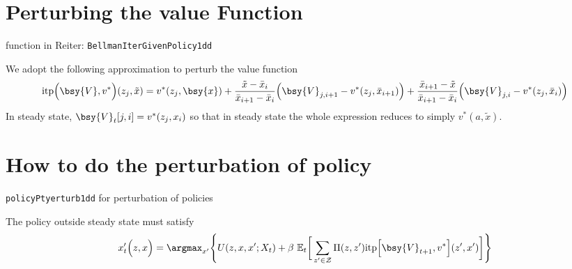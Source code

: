\documentclass[a4paper,10pt]{article}  %
\begin{document}
\newpage
\appendix
\section{Perturbing the value Function} %
\label{sub:perturbing_the_value_function}

function in Reiter: \texttt{BellmanIterGivenPolicy1dd}

We adopt the following approximation to perturb the value function
\begin{equation}
   \label{eq:interpol}
   \text{itp} \Big(  \bsy{V}, v^{*} \Big)(z_j, \tilde{x} ) = v^*( z_j, \bsy{x} ) + 
      \frac{ \tilde{x} - \bar{x}_i }{ \bar{x}_{i+1} - \bar{x}_i }    \Big( \bsy{V}_{j, i+1} - v^{*}( z_j, \bar{x}_{i+1}) \Big) +
      \frac{ \bar{x}_{i+1} -\tilde{x} }{ \bar{x}_{i+1} - \bar{x}_i } \Big( \bsy{V}_{j, i}   - v^{*}(z_j, \bar{x}_i) \Big)
\end{equation}
In steady state, $\bsy{V}_t[ j,i ] = v^* ( z_j,x_i ) $ so that in steady state the whole expression reduces to simply $ v^*( a, \tilde{x} ) $.

\section{How to do the perturbation of policy} %
\label{sub:how_to_do_the_perturbation_of_policy}

\texttt{policyPtyerturb1dd} for perturbation of policies

The policy outside steady state must satisfy
\begin{equation}
   \label{eq:maximization_prob}
   x_{t}'\Big( z, x \Big) = \argmax_{x'} \Bigg\{ U(z,x,x'; X_t) + \beta \ 
      \mathbb{E}_t
      \bigg[ 
         \sum_{ z' \in \mathcal{Z} } \Pi(z,z') \text{itp} \Big[ \bsy{V}_{t+1} , v^* \Big]( z', x' ) 
      \bigg]
      \Bigg\}
\end{equation}
\end{document}
